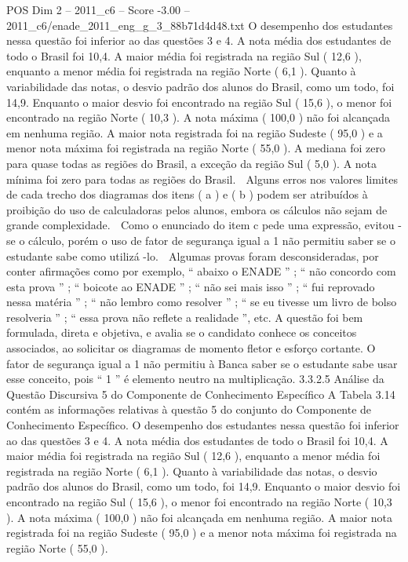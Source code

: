 \begin{textsample}{POS Dim 2 – 2011\_c6 – Score -3.00 – 2011\_c6/enade\_2011\_eng\_g\_3\_88b71d4d48.txt}
O desempenho dos estudantes nessa questão foi inferior ao das questões 3 e 4.
A nota média dos estudantes de todo o Brasil foi 10,4.
A maior média foi registrada na região Sul ( 12,6 ), enquanto a menor média foi registrada na região Norte ( 6,1 ).
Quanto à variabilidade das notas, o desvio padrão dos alunos do Brasil, como um todo, foi 14,9.
Enquanto o maior desvio foi encontrado na região Sul ( 15,6 ), o menor foi encontrado na região Norte ( 10,3 ).
A nota máxima ( 100,0 ) não foi alcançada em nenhuma região.
A maior nota registrada foi na região Sudeste ( 95,0 ) e a menor nota máxima foi registrada na região Norte ( 55,0 ).
A mediana foi zero para quase todas as regiões do Brasil, a exceção da região Sul ( 5,0 ).
A nota mínima foi zero para todas as regiões do Brasil.  Alguns erros nos valores limites de cada trecho dos diagramas dos itens ( a ) e ( b ) podem ser atribuídos à proibição do uso de calculadoras pelos alunos, embora os cálculos não sejam de grande complexidade.  Como o enunciado do item c pede uma expressão, evitou -se o cálculo, porém o uso de fator de segurança igual a 1 não permitiu saber se o estudante sabe como utilizá -lo.  Algumas provas foram desconsideradas, por conter afirmações como por exemplo, “ abaixo o ENADE ” ; “ não concordo com esta prova ” ; “ boicote ao ENADE ” ; “ não sei mais isso ” ; “ fui reprovado nessa matéria ” ; “ não lembro como resolver ” ; “ se eu tivesse um livro de bolso resolveria ” ; “ essa prova não reflete a realidade ”, etc.
A questão foi bem formulada, direta e objetiva, e avalia se o candidato conhece os conceitos associados, ao solicitar os diagramas de momento fletor e esforço cortante.
O fator de segurança igual a 1 não permitiu à Banca saber se o estudante sabe usar esse conceito, pois “ 1 ” é elemento neutro na multiplicação. 3.3.2.5 Análise da Questão Discursiva 5 do Componente de Conhecimento Específico A Tabela 3.14 contém as informações relativas à questão 5 do conjunto do Componente de Conhecimento Específico.
O desempenho dos estudantes nessa questão foi inferior ao das questões 3 e 4.
A nota média dos estudantes de todo o Brasil foi 10,4.
A maior média foi registrada na região Sul ( 12,6 ), enquanto a menor média foi registrada na região Norte ( 6,1 ).
Quanto à variabilidade das notas, o desvio padrão dos alunos do Brasil, como um todo, foi 14,9.
Enquanto o maior desvio foi encontrado na região Sul ( 15,6 ), o menor foi encontrado na região Norte ( 10,3 ).
A nota máxima ( 100,0 ) não foi alcançada em nenhuma região.
A maior nota registrada foi na região Sudeste ( 95,0 ) e a menor nota máxima foi registrada na região Norte ( 55,0 ).

\end{textsample}
